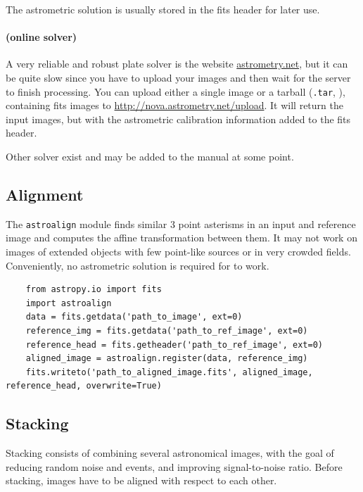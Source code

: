 \documentclass[a4paper, 11pt, fleqn]{memoir}
\begin{document}
The astrometric solution is usually stored in the fits header for later use.

\paragraph{ (online solver)}
A very reliable and robust plate solver is the website \url{astrometry.net}, but it can be quite slow since you have to upload your images and then wait for the server to finish processing.
You can upload either a single image or a tarball (\texttt{.tar}, ), containing fits images to \url{http://nova.astrometry.net/upload}.
It will return the input images, but with the astrometric calibration information added to the fits header.

Other solver exist and may be added to the manual at some point.

\subsection{Alignment}
\label{ssec:alignment}

The \texttt{astroalign} module finds similar 3 point asterisms in an input and reference image and computes the affine transformation between them.
It may not work on images of extended objects with few point-like sources or in very crowded fields.
Conveniently, no astrometric solution is required for  to work.
\begin{verbatim}
    from astropy.io import fits
    import astroalign
    data = fits.getdata('path_to_image', ext=0)
    reference_img = fits.getdata('path_to_ref_image', ext=0)
    reference_head = fits.getheader('path_to_ref_image', ext=0)
    aligned_image = astroalign.register(data, reference_img)
    fits.writeto('path_to_aligned_image.fits', aligned_image, reference_head, overwrite=True)
\end{verbatim}



\subsection{Stacking}
\label{ssec:stacking}

Stacking consists of combining several astronomical images, with the goal of reducing random noise and events, and improving signal-to-noise ratio.
Before stacking, images have to be aligned with respect to each other.
\end{document}
